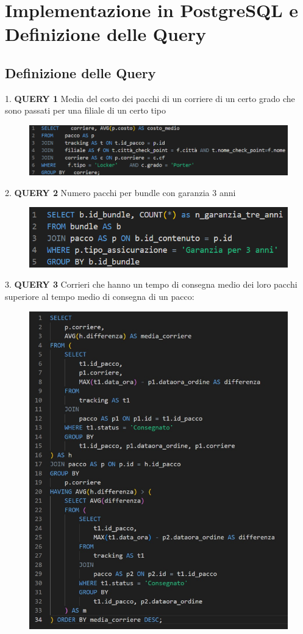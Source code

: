 \section{Implementazione in PostgreSQL e Definizione
delle Query}

\subsection{Definizione delle Query}

1. \textbf{QUERY 1} Media del costo dei pacchi di un corriere di un certo grado che sono passati per una filiale di un certo tipo
  \begin{figure}[H]
\centering
\includegraphics[width=0.8 \textwidth]{Resources/QUERY1.png}
\label{Q1}
\end{figure}
2. \textbf{QUERY 2} Numero pacchi per bundle con garanzia 3 anni
\begin{figure}[H]
\centering
\includegraphics[width=0.8 \textwidth]{Resources/QUERY2.png}
\label{Q2}
\end{figure}
3. \textbf{QUERY 3} Corrieri che hanno un tempo di consegna medio dei loro pacchi superiore al tempo medio di consegna di un pacco:
\begin{figure}[H]
\centering
\includegraphics[width=0.6 \textwidth]{Resources/QUERY3.png}
\label{Q3}
\end{figure}
